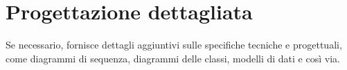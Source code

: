 \chapter{Progettazione dettagliata} \label{chap:Progettazione}
 Se necessario, fornisce dettagli aggiuntivi sulle specifiche tecniche e progettuali, come diagrammi di sequenza, diagrammi delle classi, modelli di dati e così via.